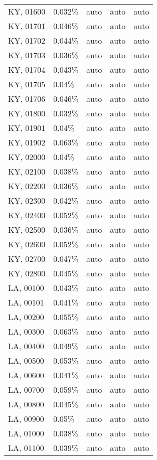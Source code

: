 \begin{longtable}[]{@{}lllll@{}}
KY, 01600 & 0.032\% & auto & auto & auto \\
KY, 01701 & 0.046\% & auto & auto & auto \\
KY, 01702 & 0.044\% & auto & auto & auto \\
KY, 01703 & 0.036\% & auto & auto & auto \\
KY, 01704 & 0.043\% & auto & auto & auto \\
KY, 01705 & 0.04\% & auto & auto & auto \\
KY, 01706 & 0.046\% & auto & auto & auto \\
KY, 01800 & 0.032\% & auto & auto & auto \\
KY, 01901 & 0.04\% & auto & auto & auto \\
KY, 01902 & 0.063\% & auto & auto & auto \\
KY, 02000 & 0.04\% & auto & auto & auto \\
KY, 02100 & 0.038\% & auto & auto & auto \\
KY, 02200 & 0.036\% & auto & auto & auto \\
KY, 02300 & 0.042\% & auto & auto & auto \\
KY, 02400 & 0.052\% & auto & auto & auto \\
KY, 02500 & 0.036\% & auto & auto & auto \\
KY, 02600 & 0.052\% & auto & auto & auto \\
KY, 02700 & 0.047\% & auto & auto & auto \\
KY, 02800 & 0.045\% & auto & auto & auto \\
LA, 00100 & 0.043\% & auto & auto & auto \\
LA, 00101 & 0.041\% & auto & auto & auto \\
LA, 00200 & 0.055\% & auto & auto & auto \\
LA, 00300 & 0.063\% & auto & auto & auto \\
LA, 00400 & 0.049\% & auto & auto & auto \\
LA, 00500 & 0.053\% & auto & auto & auto \\
LA, 00600 & 0.041\% & auto & auto & auto \\
LA, 00700 & 0.059\% & auto & auto & auto \\
LA, 00800 & 0.045\% & auto & auto & auto \\
LA, 00900 & 0.05\% & auto & auto & auto \\
LA, 01000 & 0.038\% & auto & auto & auto \\
LA, 01100 & 0.039\% & auto & auto & auto \\

\end{longtable}
